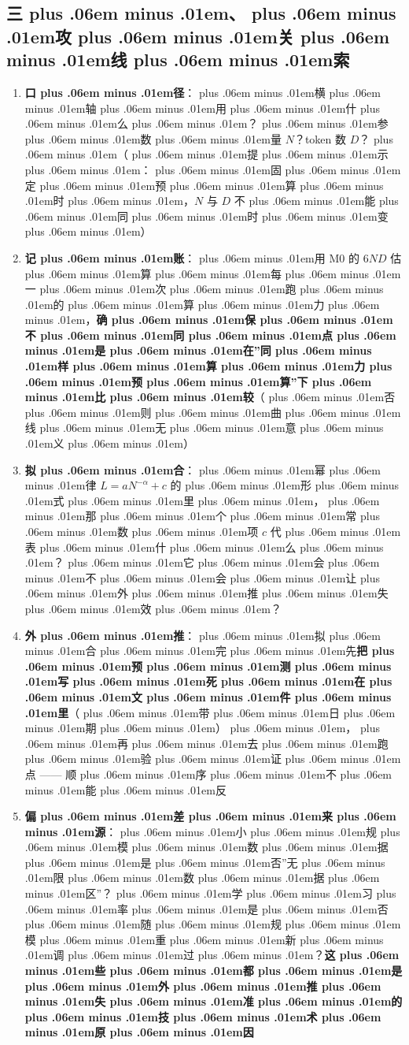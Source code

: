 \documentclass[
]{article}
\providecommand{\tightlist}{%
  \setlength{\itemsep}{0pt}\setlength{\parskip}{0pt}}
\def\zh#1{{\zhfont #1}}
\def\zhglue{\hskip0pt plus .06em minus .01em}
\begin{document}
\subsection{\zh{三\zhglue 、\zhglue 攻\zhglue 关\zhglue 线\zhglue 索}}\label{ux4e09ux653bux5173ux7ebfux7d22-1}

\begin{enumerate}
\def\labelenumi{\arabic{enumi}.}
\tightlist
\item
  \textbf{\zh{口\zhglue 径}}\zh{：\zhglue 横\zhglue 轴\zhglue 用\zhglue 什\zhglue 么\zhglue ？\zhglue 参\zhglue 数\zhglue 量} \(N\)\zh{？}token \zh{数} \(D\)\zh{？\zhglue （\zhglue 提\zhglue 示\zhglue ：\zhglue 固\zhglue 定\zhglue 预\zhglue 算\zhglue 时\zhglue ，}\(N\) \zh{与} \(D\) \zh{不\zhglue 能\zhglue 同\zhglue 时\zhglue 变\zhglue ）}
\item
  \textbf{\zh{记\zhglue 账}}\zh{：\zhglue 用} M0 \zh{的} \(6ND\) \zh{估\zhglue 算\zhglue 每\zhglue 一\zhglue 次\zhglue 跑\zhglue 的\zhglue 算\zhglue 力\zhglue ，}\textbf{\zh{确\zhglue 保\zhglue 不\zhglue 同\zhglue 点\zhglue 是\zhglue 在}''\zh{同\zhglue 样\zhglue 算\zhglue 力\zhglue 预\zhglue 算}''\zh{下\zhglue 比\zhglue 较}}\zh{（\zhglue 否\zhglue 则\zhglue 曲\zhglue 线\zhglue 无\zhglue 意\zhglue 义\zhglue ）}
\item
  \textbf{\zh{拟\zhglue 合}}\zh{：\zhglue 幂\zhglue 律} \(L = aN^{-\alpha} + c\) \zh{的\zhglue 形\zhglue 式\zhglue 里\zhglue ，\zhglue 那\zhglue 个\zhglue 常\zhglue 数\zhglue 项} \(c\) \zh{代\zhglue 表\zhglue 什\zhglue 么\zhglue ？\zhglue 它\zhglue 会\zhglue 不\zhglue 会\zhglue 让\zhglue 外\zhglue 推\zhglue 失\zhglue 效\zhglue ？}
\item
  \textbf{\zh{外\zhglue 推}}\zh{：\zhglue 拟\zhglue 合\zhglue 完\zhglue 先}\textbf{\zh{把\zhglue 预\zhglue 测\zhglue 写\zhglue 死\zhglue 在\zhglue 文\zhglue 件\zhglue 里}}\zh{（\zhglue 带\zhglue 日\zhglue 期\zhglue ）\zhglue ，\zhglue 再\zhglue 去\zhglue 跑\zhglue 验\zhglue 证\zhglue 点} ------ \zh{顺\zhglue 序\zhglue 不\zhglue 能\zhglue 反}
\item
  \textbf{\zh{偏\zhglue 差\zhglue 来\zhglue 源}}\zh{：\zhglue 小\zhglue 规\zhglue 模\zhglue 数\zhglue 据\zhglue 是\zhglue 否}''\zh{无\zhglue 限\zhglue 数\zhglue 据\zhglue 区}''\zh{？\zhglue 学\zhglue 习\zhglue 率\zhglue 是\zhglue 否\zhglue 随\zhglue 规\zhglue 模\zhglue 重\zhglue 新\zhglue 调\zhglue 过\zhglue ？}\textbf{\zh{这\zhglue 些\zhglue 都\zhglue 是\zhglue 外\zhglue 推\zhglue 失\zhglue 准\zhglue 的\zhglue 技\zhglue 术\zhglue 原\zhglue 因}}
\end{enumerate}
\end{document}
